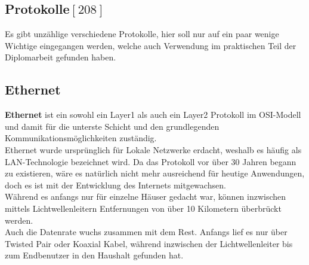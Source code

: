 \documentclass[12pt,a4paper]{report}
\begin{document}
\begin{onehalfspace}
\section{Protokolle${[208]}$}
Es gibt unzählige verschiedene Protokolle, hier soll nur auf ein paar wenige Wichtige eingegangen werden, welche auch Verwendung im praktischen Teil der Diplomarbeit gefunden haben.
\subsection{Ethernet}\label{ssec:eth}
\textbf{Ethernet} ist ein sowohl ein Layer1 als auch ein Layer2 Protokoll im OSI-Modell und damit für die unterste Schicht und den grundlegenden Kommunikationsmöglichkeiten zuständig.\\

Ethernet wurde ursprünglich für Lokale Netzwerke erdacht, weshalb es häufig als LAN-Technologie bezeichnet wird. Da das Protokoll vor über 30 Jahren begann zu existieren, wäre es natürlich nicht mehr ausreichend für heutige Anwendungen, doch es ist mit der Entwicklung des Internets mitgewachsen.\\
Während es anfangs nur für einzelne Häuser gedacht war, können inzwischen mittels Lichtwellenleitern Entfernungen von über 10 Kilometern überbrückt werden.\\

Auch die Datenrate wuchs zusammen mit dem Rest. Anfangs lief es nur über Twisted Pair oder Koaxial Kabel, während inzwischen der Lichtwellenleiter bis zum Endbenutzer in den Haushalt gefunden hat.\\


\end{onehalfspace}
\end{document}
